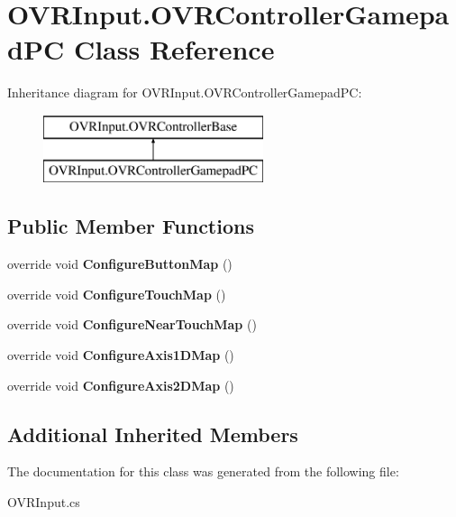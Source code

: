 \hypertarget{class_o_v_r_input_1_1_o_v_r_controller_gamepad_p_c}{}\section{O\+V\+R\+Input.\+O\+V\+R\+Controller\+Gamepad\+PC Class Reference}
\label{class_o_v_r_input_1_1_o_v_r_controller_gamepad_p_c}
Inheritance diagram for O\+V\+R\+Input.\+O\+V\+R\+Controller\+Gamepad\+PC\+:\begin{figure}[H]
\begin{center}
\leavevmode
\includegraphics[height=2.000000cm]{class_o_v_r_input_1_1_o_v_r_controller_gamepad_p_c}
\end{center}
\end{figure}
\subsection*{Public Member Functions}
\begin{DoxyCompactItemize}
\item 
\mbox{\label{class_o_v_r_input_1_1_o_v_r_controller_gamepad_p_c_abd0070d6ba116e86bc2561a2a1438d3c}} 
override void {\bfseries Configure\+Button\+Map} ()
\item 
\mbox{\label{class_o_v_r_input_1_1_o_v_r_controller_gamepad_p_c_a1cca4a3667c2d5729c3c6d0a053811a6}} 
override void {\bfseries Configure\+Touch\+Map} ()
\item 
\mbox{\label{class_o_v_r_input_1_1_o_v_r_controller_gamepad_p_c_a0d32c3886819bc845d36035e187645c3}} 
override void {\bfseries Configure\+Near\+Touch\+Map} ()
\item 
\mbox{\label{class_o_v_r_input_1_1_o_v_r_controller_gamepad_p_c_a3456ac8114d83e30c114a5d22742f166}} 
override void {\bfseries Configure\+Axis1\+D\+Map} ()
\item 
\mbox{\label{class_o_v_r_input_1_1_o_v_r_controller_gamepad_p_c_a5bb081f7895ddef0cf9532aa28b29e24}} 
override void {\bfseries Configure\+Axis2\+D\+Map} ()
\end{DoxyCompactItemize}
\subsection*{Additional Inherited Members}


The documentation for this class was generated from the following file\+:\begin{DoxyCompactItemize}
\item 
O\+V\+R\+Input.\+cs\end{DoxyCompactItemize}
